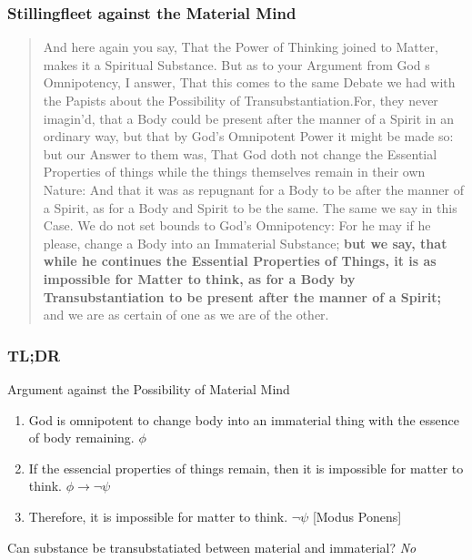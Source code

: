 \documentclass{beamer}
\begin{document}
\begin{frame}
    \frametitle{Stillingfleet against the Material Mind}
    \begin{small}
    \begin{quote}
    And here again you say, That the Power of Thinking joined to Matter, makes it a Spiritual Substance. But as to your Argument from God s Omnipotency, I answer, That this comes to the same Debate we had with the Papists about the Possibility of Transubstantiation.For, they never imagin'd, that a Body could be present after the manner of a Spirit in an ordinary way, but that by God's Omnipotent Power it might be made so: but our Answer to them was, That God doth not change the Essential Properties of things while the things themselves remain in their own Nature: And that it was as repugnant for a Body to be after the manner of a Spirit, as for a Body and Spirit to be the same. The same we say in this Case. We do not set bounds to God's Omnipotency: For he may if he please, change a Body into an Immaterial Substance; \textbf{but we say, that while he continues the Essential Properties of Things, it is as impossible for Matter to think, as for a Body by Transubstantiation to be present after the manner of a Spirit;} and we are as certain of one as we are of the other. \cite{stillingfleet-1698}
    \end{quote}
    \end{small}
\end{frame}

\begin{frame}
    \frametitle{TL;DR}
    \begin{block}{Argument against the Possibility of Material Mind}
        \begin{enumerate}
            \item God is omnipotent to change body into an immaterial thing with the essence of body remaining. $\phi$
            \item If the essencial properties of things remain, then it is impossible for matter to think. $\phi \rightarrow \neg \psi$
            \item Therefore, it is impossible for matter to think. $\neg \psi$ [Modus Ponens]
        \end{enumerate}
    \end{block}
    Can substance be transubstatiated between material and immaterial? \emph{No}
\end{frame}
\end{document}

